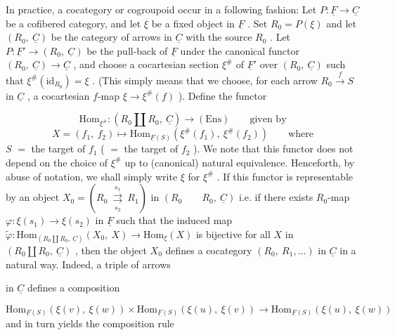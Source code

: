 In practice, a cocategory or cogroupoid occur in a following fashion: Let $P : \underline{F} \to \underline{C}$ be a cofibered category, and let $\xi$ be a fixed object in $\underline{F}$ . Set $R_0 = P(\xi)$ and let $(R_0,\ \underline{C})$ be the category of arrows in $\underline{C}$ with the source $R_0$ . Let $P : \underline{F}' \to (R_0,\ \underline{C})$ be the pull-back of $\underline{F}$ under the canonical functor $(R_0,\ \underline{C}) \to \underline{C}$ , and choose a cocartesian section $\xi^{\#}$ of $\underline{F}'$ over $(R_0,\ \underline{C})$ such that $\xi^{\#}(\mathrm{id}_{R_0}) = \xi$ . (This simply means that we choose, for each arrow $R_0 \xrightarrow{f} S$ in $\underline{C}$ , a cocartesian $f$-map $\xi \to \xi^{\#}(f)$ ). Define the functor

\begin{equation*}
\mathrm{Hom}_{\xi^{\#}} : (R_0 \amalg R_0,\ \underline{C}) \to (\mathrm{Ens}) \qquad \text{given by}
\end{equation*}
\begin{equation*}
X = (f_1,\ f_2) \longmapsto \mathrm{Hom}_{\underline{F}(S)}(\xi^{\#}(f_1),\ \xi^{\#}(f_2)) \qquad \text{where}
\end{equation*}
$S$ $=$ the target of $f_1$ ( $=$ the target of $f_2$ ). We note that this functor does not depend on the choice of $\xi^{\#}$ up to (canonical) natural equivalence. Henceforth, by abuse of notation, we shall simply write $\xi$ for $\xi^{\#}$ . If this functor is representable by an object $X_0 = (R_0 \ \overset{s_1}{\underset{s_2}{\rightrightarrows}}\ R_1)$ in $(R_0 \qquad R_0,\ \underline{C})$ i.e. if there exists $R_0$-map $\varphi : \xi(s_1) \to \xi(s_2)$ in $\underline{F}$ such that the induced map $\widetilde{\varphi} : \mathrm{Hom}_{(R_0 \amalg R_0,\ \underline{C})}(X_0,\ X) \to \mathrm{Hom}_{\xi}(X)$ is bijective for all $X$ in $(R_0 \amalg R_0,\ \underline{C})$ , then the object $X_0$ defines a cocategory $(R_0,\ R_1,\ldots)$ in $\underline{C}$ in a natural way. Indeed, a triple of arrows
in $\underline{C}$ defines a composition

\begin{equation*}
\mathrm{Hom}_{\underline{F}(S)}(\xi(v),\ \xi(w)) \times \mathrm{Hom}_{\underline{F}(S)}(\xi(u),\ \xi(v)) \to \mathrm{Hom}_{\underline{F}(S)}(\xi(u),\ \xi(w))
\end{equation*}
and in turn yields the composition rule

